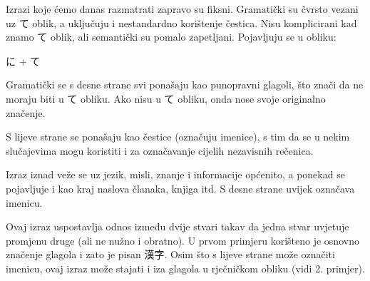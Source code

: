
\author{Tomislav Mamić}


	
	
	Izrazi koje ćemo danas razmatrati zapravo su fiksni. Gramatički su čvrsto vezani uz て oblik, a uključuju i nestandardno korištenje čestica. Nisu komplicirani kad znamo て oblik, ali semantički su pomalo zapetljani. Pojavljuju se u obliku:
	
	\hspace{30pt} に + て
	
	Gramatički se s desne strane svi ponašaju kao punopravni glagoli, što znači da ne moraju biti u て obliku. Ako nisu u て obliku, onda nose svoje originalno značenje.
	
	S lijeve strane se ponašaju kao čestice (označuju imenice), s tim da se u nekim slučajevima mogu koristiti i za označavanje cijelih nezavisnih rečenica.
	
	\begin{reibun}
	\end{reibun}
	
	Izraz iznad veže se uz jezik, misli, znanje i informacije općenito, a ponekad se pojavljuje i kao kraj naslova članaka, knjiga itd. S desne strane uvijek označava imenicu.
	
	\begin{reibun}
	\end{reibun}

	Ovaj izraz uspostavlja odnos između dvije stvari takav da jedna stvar uvjetuje promjenu druge (ali ne nužno i obratno). U prvom primjeru korišteno je osnovno značenje glagola i zato je pisan 漢字. Osim što s lijeve strane može označiti imenicu, ovaj izraz može stajati i iza glagola u rječničkom obliku (vidi 2. primjer).
	
